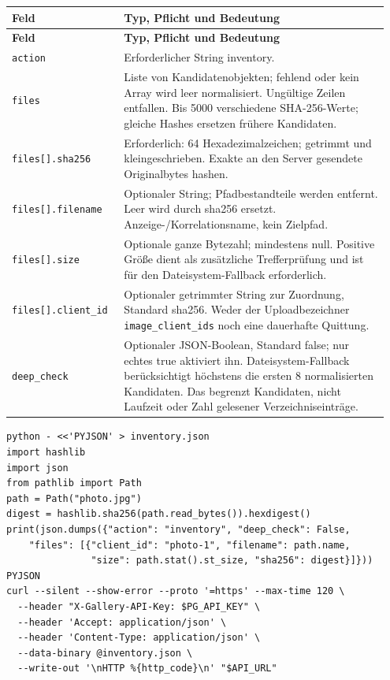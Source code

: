 \documentclass[11pt,a4paper]{article}
\newcommand{\codeword}[1]{\nolinkurl{#1}}
\begin{document}
\begin{longtable}{@{}>{\RaggedRight\arraybackslash}p{0.28\linewidth}>{\RaggedRight\arraybackslash}p{0.67\linewidth}@{}}
\toprule
\textbf{Feld} & \textbf{Typ, Pflicht und Bedeutung} \\
\midrule
\endfirsthead
\toprule
\textbf{Feld} & \textbf{Typ, Pflicht und Bedeutung} \\
\midrule
\endhead
\bottomrule
\endfoot
\codeword{action} & Erforderlicher String inventory. \\
\codeword{files} & Liste von Kandidatenobjekten; fehlend oder kein Array wird leer
normalisiert. Ungültige Zeilen entfallen. Bis 5000 verschiedene SHA-256-Werte; gleiche
Hashes ersetzen frühere Kandidaten. \\
\codeword{files[].sha256} & Erforderlich: 64 Hexadezimalzeichen; getrimmt und
kleingeschrieben. Exakte an den Server gesendete Originalbytes hashen. \\
\codeword{files[].filename} & Optionaler String; Pfadbestandteile werden entfernt. Leer wird
durch sha256 ersetzt. Anzeige-/Korrelationsname, kein Zielpfad. \\
\codeword{files[].size} & Optionale ganze Bytezahl; mindestens null. Positive Größe dient
als zusätzliche Trefferprüfung und ist für den Dateisystem-Fallback erforderlich. \\
\codeword{files[].client_id} & Optionaler getrimmter String zur Zuordnung, Standard sha256.
Weder der Uploadbezeichner \codeword{image_client_ids} noch eine dauerhafte Quittung. \\
\codeword{deep_check} & Optionaler JSON-Boolean, Standard false; nur echtes true aktiviert
ihn. Dateisystem-Fallback berücksichtigt höchstens die ersten 8 normalisierten Kandidaten.
Das begrenzt Kandidaten, nicht Laufzeit oder Zahl gelesener Verzeichniseinträge. \\
\end{longtable}

\begin{lstlisting}[language={}]
python - <<'PYJSON' > inventory.json
import hashlib
import json
from pathlib import Path
path = Path("photo.jpg")
digest = hashlib.sha256(path.read_bytes()).hexdigest()
print(json.dumps({"action": "inventory", "deep_check": False,
    "files": [{"client_id": "photo-1", "filename": path.name,
               "size": path.stat().st_size, "sha256": digest}]}))
PYJSON
curl --silent --show-error --proto '=https' --max-time 120 \
  --header "X-Gallery-API-Key: $PG_API_KEY" \
  --header 'Accept: application/json' \
  --header 'Content-Type: application/json' \
  --data-binary @inventory.json \
  --write-out '\nHTTP %{http_code}\n' "$API_URL"
\end{lstlisting}
\end{document}
